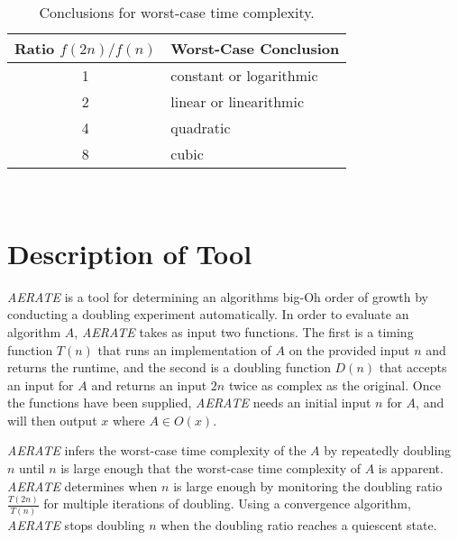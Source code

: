 \documentclass[10pt,twocolumn]{article}
\begin{document}
\begin{table}[h!]
  \vspace*{-.15in}
  \begin{center}
    \begin{tabular}{c|l}
      Ratio $f(2n)/f(n)$ & Worst-Case Conclusion              \\ \hline
      1                  & constant or logarithmic \\
      2                  & linear or linearithmic  \\
      4                  & quadratic               \\
      8                  & cubic                   \\
    \end{tabular}
  \end{center}
  \vspace*{-.25in}

  \caption{Conclusions for worst-case time complexity.}~\label{table:ratios}
  \vspace*{-.35in}

\end{table}

\section{Description of Tool}
    \textit{AERATE} \cite{kinneer2015,tool} is a tool for
    determining an algorithms big-Oh order of growth by
    conducting a doubling experiment automatically.  In order to
    evaluate an algorithm $A$, \textit{AERATE} takes as input two
    functions. The first is a timing function $T(n)$ that runs an
    implementation of $A$ on the provided input $n$ and returns
    the runtime, and the second is a doubling function $D(n)$ that
    accepts an input for $A$ and returns an input $2n$ twice as
    complex as the original. Once the functions have been supplied,
    \textit{AERATE} needs an initial input $n$ for $A$, and will then 
    output $x$ where $A \in O(x)$.

    \textit{AERATE} infers the worst-case time complexity of the $A$ by
    repeatedly doubling $n$ until $n$ is large enough that the
    worst-case time complexity of $A$ is apparent.  \textit{AERATE}
    determines when $n$ is large enough by monitoring the doubling
    ratio $\frac{T(2n)}{T(n)}$ for multiple iterations of doubling.
    Using a convergence algorithm, \textit{AERATE} stops doubling $n$
    when the doubling ratio reaches a quiescent state.
   
\end{document}

